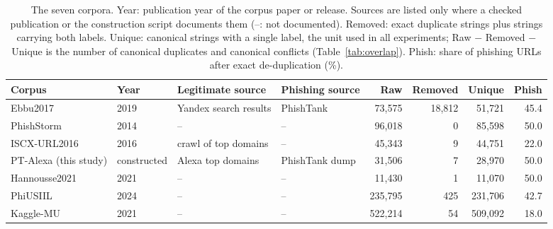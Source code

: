 \begin{table}[tp]
\centering
\caption{The seven corpora. Year: publication year of the corpus paper or release. Sources are listed only where a checked publication or the construction script documents them (--: not documented). Removed: exact duplicate strings plus strings carrying both labels. Unique: canonical strings with a single label, the unit used in all experiments; Raw $-$ Removed $-$ Unique is the number of canonical duplicates and canonical conflicts (Table~\ref{tab:overlap}). Phish: share of phishing URLs after exact de-duplication (\%).}
\label{tab:corpora}
\footnotesize
\begin{adjustbox}{max width=\linewidth}
\begin{tabular}{@{}lllp{2.4cm}rrrr@{}}
\toprule
Corpus & Year & Legitimate source & Phishing source & Raw & Removed & Unique & Phish \\
\midrule
Ebbu2017 \citep{sahingoz2019} & 2019 & Yandex search results & PhishTank & 73,575 & 18,812 & 51,721 & 45.4 \\
PhishStorm \citep{marchal2014} & 2014 & -- & -- & 96,018 & 0 & 85,598 & 50.0 \\
ISCX-URL2016 \citep{mamun2016} & 2016 & crawl of top domains & -- & 45,343 & 9 & 44,751 & 22.0 \\
PT-Alexa (this study) & constructed & Alexa top domains & PhishTank dump & 31,506 & 7 & 28,970 & 50.0 \\
Hannousse2021 \citep{hannousse2021} & 2021 & -- & -- & 11,430 & 1 & 11,070 & 50.0 \\
PhiUSIIL \citep{prasad2024} & 2024 & -- & -- & 235,795 & 425 & 231,706 & 42.7 \\
Kaggle-MU \citep{siddhartha2021} & 2021 & -- & -- & 522,214 & 54 & 509,092 & 18.0 \\
\bottomrule
\end{tabular}
\end{adjustbox}
\end{table}
